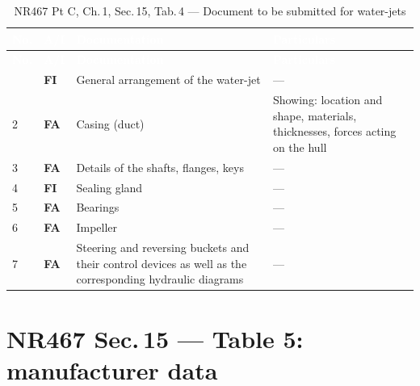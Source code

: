 \documentclass[11pt,a4paper]{report}
\newcommand{\fa}{\textbf{\textcolor{warningred}{FA}}}
\newcommand{\fic}{\textbf{\textcolor{bvgray}{FI}}}
\begin{document}
\begin{longtable}{|p{0.7cm}|p{1.1cm}|p{6.2cm}|p{6.0cm}|}
\caption{NR467 Pt C, Ch.\,1, Sec.\,15, Tab.\,4 --- Document to be submitted for water-jets} \label{tab:s15t4} \\
\hline
\rowcolor{bvblue}
\textcolor{white}{\textbf{No.}} & \textcolor{white}{\textbf{A/I}} & \textcolor{white}{\textbf{Documentation}} & \textcolor{white}{\textbf{Particulars}} \\
\hline
\endfirsthead
\hline
\rowcolor{bvblue}
\textcolor{white}{\textbf{No.}} & \textcolor{white}{\textbf{A/I}} & \textcolor{white}{\textbf{Documentation}} & \textcolor{white}{\textbf{Particulars}} \\
\hline
\endhead
\hline
\endlastfoot
1 & \fic{} & General arrangement of the water-jet & --- \\
\hline
2 & \fa{} & Casing (duct) & Showing: location and shape, materials, thicknesses, forces acting on the hull \\
\hline
3 & \fa{} & Details of the shafts, flanges, keys & --- \\
\hline
4 & \fic{} & Sealing gland & --- \\
\hline
5 & \fa{} & Bearings & --- \\
\hline
6 & \fa{} & Impeller & --- \\
\hline
7 & \fa{} & Steering and reversing buckets and their control devices as well as the corresponding hydraulic diagrams & --- \\
\hline
\end{longtable}

\section{NR467 Sec.\,15 --- Table 5: manufacturer data}
\end{document}

